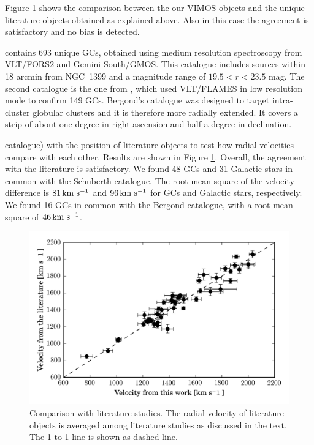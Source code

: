 Figure \ref{fig:vel_comparison} shows the comparison between the our VIMOS 
objects and the unique literature objects obtained as explained above. Also in 
this case the agreement is satisfactory and no bias is detected. 

\citep{Schuberth} contains 693 unique GCs, obtained using medium resolution 
spectroscopy from VLT/FORS2 and Gemini-South/GMOS. This catalogue includes 
sources within 18 arcmin from NGC~1399 and a magnitude range of $19.5<r<23.5$ 
mag. The second catalogue is the one from \citet{Bergond07}, which used 
VLT/FLAMES in low resolution mode to confirm 149 GCs. Bergond's catalogue was 
designed to target intra-cluster globular clusters and it is therefore more 
radially extended. It covers a strip of about one degree in right ascension and 
half a degree in declination. 

catalogue) with the position of literature objects to test how radial 
velocities compare with each other. Results are shown in Figure 
\ref{fig:vel_comparison}. Overall, the agreement with the literature is 
satisfactory. We found 48 GCs and 31 Galactic stars in common with the 
Schuberth catalogue. The root-mean-square of the velocity difference is 
$81\mbox{\,km~s$^{-1}$}$ and $96\mbox{\,km~s$^{-1}$}$ for GCs and Galactic stars, respectively. We found 16 GCs 
in common with the Bergond catalogue, with a root-mean-square of $46 \mbox{\,km~s$^{-1}$}$. 

\begin{figure}
\centering
\includegraphics[width=\columnwidth]{figures/vel_literature.png} 
\caption{Comparison with literature studies. The radial velocity of literature 
objects is averaged among literature studies as discussed in the text. The 1 to 
1 line is shown as dashed line. }
\label{fig:vel_comparison}
\end{figure}

